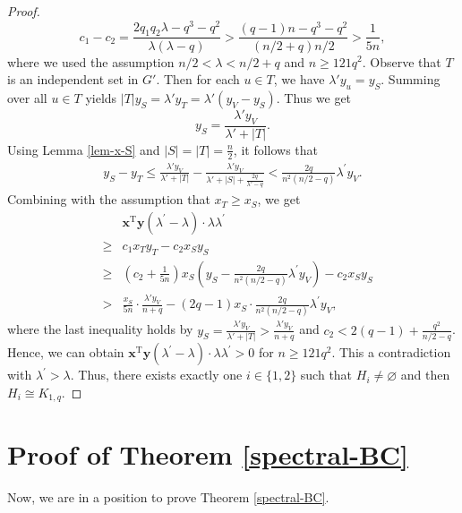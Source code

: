 \documentclass[11pt]{article}
\begin{document}
\begin{proof}
 \[  c_1-c_2=\frac{2q_1q_2 \lambda - q^3-q^2}{\lambda (\lambda -q)} > \frac{(q-1)n - q^3-q^2}{(n/2 +q)n/2} > \frac{1}{5n}, \]
 where we used the assumption 
 ${n}/{2} < \lambda < {n}/{2} +q$ 
 and $n\ge 121q^2$. 
 Observe that $T$ is an independent set 
 in $G'$. Then for each $u\in T$, we have 
 $\lambda' y_u = y_S$.   Summing over all $u\in T$ yields 
 $|T| y_S = \lambda' y_T= \lambda' (y_V -y_S)$. 
Thus we get  
 \[  y_S= \frac{\lambda' y_V}{\lambda ' + |T|} . \]  
Using Lemma \ref{lem-x-S} and $|S|=|T|= \frac{n}{2}$,
it follows that  
  \begin{eqnarray*}  
  y_S-y_T \le  
  \frac{\lambda' y_V}{\lambda ' + |T|} - \frac{\lambda' y_V}{\lambda' + |S| + \frac{2q}{\lambda' -q}} 
  <  \frac{2q}{n^2(n/2 -q)} \lambda^{\prime} y_V. 
 \end{eqnarray*}  
Combining with the assumption that $x_T \geq x_S$, 
  we get 
\begin{eqnarray*}   
&& \bm{x}^{\mathrm{T}} \bm{y} 
(\lambda^{\prime}-\lambda) \cdot  \lambda \lambda^{\prime}  \\[3mm]  
&\ge &  c_1x_Ty_T - c_2 x_S y_S   \\[3mm]
& \geq & \left(c_2+\frac{1}{5n}\right)  x_S 
\left(y_S -\frac{2q}{n^2(n/2 -q)} \lambda^{\prime} y_V \right)  -c_2 x_S y_S \\
& > & \frac{ x_S}{5n} \cdot \frac{\lambda' y_V}{n+q}  - 
 ( 2q-1)x_S \cdot \frac{2q}{n^2(n/2 -q)} \lambda^{\prime} y_V , 
\end{eqnarray*}  
where the last inequality holds by 
 $y_S = \frac{\lambda' y_V}{\lambda ' + |T|} > \frac{\lambda' y_V}{n+q}$ and 
$c_2  < 2(q-1) + \frac{q^2}{n/2 -q}$. 
Hence,  we can obtain $\bm{x}^{\mathrm{T}} \bm{y} 
(\lambda^{\prime}-\lambda) \cdot  \lambda \lambda^{\prime} >0$ for $n\ge 121q^2$. This a contradiction 
with $\lambda^{\prime}>\lambda$. 
Thus, there exists exactly one $i\in \{1,2\}$ such that 
$H_i\neq \varnothing$ and then $H_i\cong K_{1,q}$. 
\end{proof}


\section{Proof of Theorem \ref{spectral-BC}}

\label{sec6}

Now, we are in a position to 
 prove Theorem \ref{spectral-BC}. 
\end{document}
